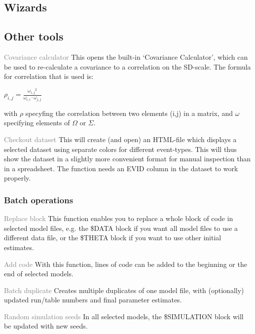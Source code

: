 \documentclass[a4,11pt]{report} \usepackage[pdftex]{graphicx}
\begin{document}
{{\subsection{Wizards}


\subsection{Other tools}

\begin {description}
  \item{\textcolor{Grey}{Covariance calculator}} This opens the
built-in `Covariance Calculator', which can be used to re-calculate a
covariance to a correlation on the SD-scale. The formula for
correlation that is used is:

\vspace{10pt}
$ \rho_{i,j} = \frac{{\omega_{i,j}}^2 }{\omega_{i,i} \cdot \omega_{j,j} }
$
\vspace{10pt}

with $\rho$ specyfing the correlation between two elements (i,j) in a
matrix, and $\omega$ specifying elements of $\Omega$ or $\Sigma$.

  \item{\textcolor{Grey}{Checkout dataset}} This will create (and open)
an HTML-file which displays a selected dataset using separate colors for
different event-types. This will thus show the dataset in a slightly more
convenient format for manual inspection than in a spreadsheet. The
function needs an EVID column in the dataset to work properly.
\end{description}

\subsubsection*{Batch operations}
\begin{description}
	\item{\textcolor{Grey}{Replace block}} This function enables
you to replace a whole block of code in selected model files, e.g. the
\$DATA block if you want all model files to use a different data file,
or the \$THETA block if you want to use other initial estimates.
	\item{\textcolor{Grey}{Add code}} With this function, lines of
code can be added to the beginning or the end of selected models.
	\item{\textcolor{Grey}{Batch duplicate}} Creates multiple
duplicates of one model file, with (optionally) updated run/table
numbers and final parameter estimates.
	\item{\textcolor{Grey}{Random simulation seeds}} In all
selected models, the \$SIMULATION block will be updated with new
seeds.
\end{description}

}}
\end{document}
